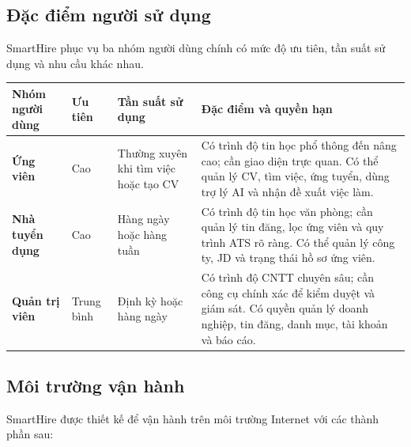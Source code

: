 \subsection{Đặc điểm người sử dụng}

SmartHire phục vụ ba nhóm người dùng chính có mức độ ưu tiên, tần suất sử dụng và nhu cầu khác nhau.

\noindent
\begin{tabularx}{\textwidth}{|L{2.5cm}|L{1.6cm}|L{2.5cm}|X|}
    \hline
    \textbf{Nhóm người dùng} & \textbf{Ưu tiên} & \textbf{Tần suất sử dụng} & \textbf{Đặc điểm và quyền hạn} \\ \hline
    \textbf{Ứng viên} & Cao & Thường xuyên khi tìm việc hoặc tạo CV & Có trình độ tin học phổ thông đến nâng cao; cần giao diện trực quan. Có thể quản lý CV, tìm việc, ứng tuyển, dùng trợ lý AI và nhận đề xuất việc làm. \\ \hline
    \textbf{Nhà tuyển dụng} & Cao & Hàng ngày hoặc hàng tuần & Có trình độ tin học văn phòng; cần quản lý tin đăng, lọc ứng viên và quy trình ATS rõ ràng. Có thể quản lý công ty, JD và trạng thái hồ sơ ứng viên. \\ \hline
    \textbf{Quản trị viên} & Trung bình & Định kỳ hoặc hàng ngày & Có trình độ CNTT chuyên sâu; cần công cụ chính xác để kiểm duyệt và giám sát. Có quyền quản lý doanh nghiệp, tin đăng, danh mục, tài khoản và báo cáo. \\ \hline
\end{tabularx}

\subsection{Môi trường vận hành}

\noindent SmartHire được thiết kế để vận hành trên môi trường Internet với các thành phần sau:

